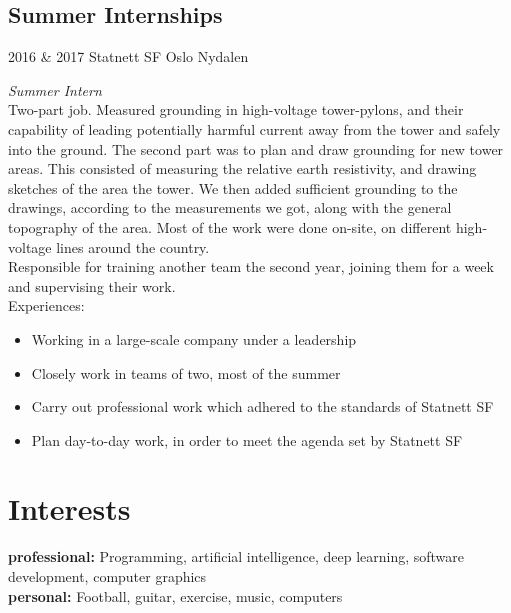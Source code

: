 \documentclass[]{friggeri-cv} %
\begin{document}
\subsection{Summer Internships}

\begin{entrylist}

\entry
{2016 \& 2017}
{Statnett SF}
{Oslo Nydalen}
{\emph{Summer Intern} \\
Two-part job. Measured grounding in high-voltage tower-pylons, and their capability of leading potentially harmful current away from the tower and safely into the ground. The second part was to plan and draw grounding for new tower areas. This consisted of measuring the relative earth resistivity, and drawing sketches of the area the tower. We then added sufficient grounding to the drawings, according to the measurements we got, along with the general topography of the area. Most of the work were done on-site, on different high-voltage lines around the country.
\\
Responsible for training another team the second year, joining them for a week and supervising their work. 
\\
Experiences:
\begin{itemize}
\item Working in a large-scale company under a leadership
\item Closely work in teams of two, most of the summer
\item Carry out professional work which adhered to the standards of Statnett SF
\item Plan day-to-day work, in order to meet the agenda set by Statnett SF
\end{itemize}}



\end{entrylist}


\section{Interests}

\textbf{professional:} Programming, artificial intelligence, deep learning, software development, computer graphics 
\\
\textbf{personal:} Football, guitar, exercise, music, computers
\end{document}
